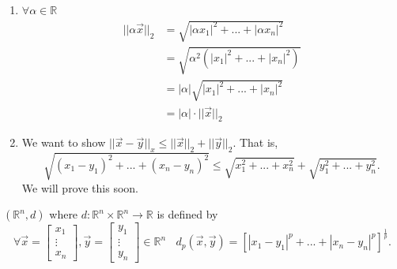 \begin{example}
\begin{enumerate}[$(i)$]
        \item $\forall \alpha \in \mathbb{R}$ ~~~ \begin{align*}||\alpha \overrightarrow{x}||_2 &= \sqrt{|\alpha x_1|^2+...+|\alpha x_n|^2} \\ &= \sqrt{\alpha ^2(|x_1|^2+...+|x_n|^2)} \\ &=|\alpha|\sqrt{|x_1|^2+...+|x_n|^2} \\ &= |\alpha|\cdot ||\overrightarrow{x}||_2 \end{align*}
        \item We want to show $||\overrightarrow{x} - \overrightarrow{y}||_x \leq ||\overrightarrow{x}||_2 + ||\overrightarrow{y}||_2$.
        That is,
        $$\sqrt{(x_1-y_1)^2 + ... + (x_n - y_n)^2} \leq \sqrt{x_1^2+...+x_n^2} + \sqrt{y_1^2+...+y_n^2}.$$
        We will prove this soon.
    \end{enumerate}
\end{example}

\begin{example}
    $(\mathbb{R}^n, d)$ where $d:\mathbb{R}^n \times \mathbb{R}^n \rightarrow \mathbb{R}$ is defined by
    $$\forall \overrightarrow{x}=\begin{bmatrix}x_1 \\ \vdots \\ x_n \end{bmatrix}, \overrightarrow{y} = \begin{bmatrix} y_1 \\ \vdots \\ y_n \end{bmatrix} \in \mathbb{R}^n ~~~~ d_p(\overrightarrow{x}, \overrightarrow{y}) = [|x_1 - y_1|^p +... + |x_n - y_n|^p]^{\frac{1}{p}}.$$
\end{example}